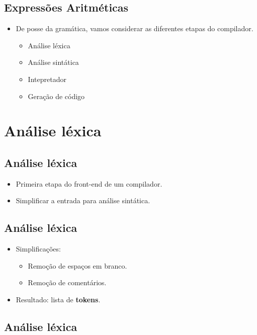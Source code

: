\documentclass[11pt]{article}
\begin{document}
\subsection*{Expressões Aritméticas}
\label{sec:org44fcfae}

\begin{itemize}
\item De posse da gramática, vamos considerar as diferentes etapas do compilador. 
\begin{itemize}
\item Análise léxica
\item Análise sintática
\item Intepretador
\item Geração de código
\end{itemize}
\end{itemize}
\section*{Análise léxica}
\label{sec:org6a83778}

\subsection*{Análise léxica}
\label{sec:org93b8168}

\begin{itemize}
\item Primeira etapa do front-end de um compilador.
\item Simplificar a entrada para análise sintática.
\end{itemize}
\subsection*{Análise léxica}
\label{sec:orgc477053}

\begin{itemize}
\item Simplificações:
\begin{itemize}
\item Remoção de espaços em branco.
\item Remoção de comentários.
\end{itemize}

\item Resultado: lista de \textbf{\textbf{tokens}}.
\end{itemize}
\subsection*{Análise léxica}
\label{sec:orgf24635c}
\end{document}
